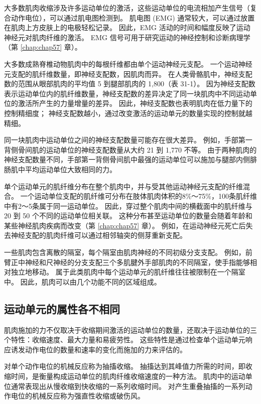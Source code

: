 大多数肌肉收缩涉及许多运动单位的激活，这些运动单位的电流相加产生信号（复合动作电位），可以通过肌电图检测到。 肌电图 (EMG) 通常较大，可以通过放置在肌肉上方皮肤上的电极轻松记录。 因此，EMG 活动的时间和幅度反映了运动神经元对肌肉纤维的激活。 EMG 信号可用于研究运动的神经控制和诊断病理学（第 \ref{chap:chap57} 章）。

大多数成熟脊椎动物肌肉中的每根纤维都由单个运动神经元支配。 一个运动神经元支配的肌纤维数量，即神经支配数，因肌肉而异。 在人类骨骼肌中，神经支配数的范围从眼部肌肉的平均值 5 到腿部肌肉的 1,800（表 31-1）。 因为神经支配数表示运动单位内的肌纤维数量，神经支配数的差异决定了同一块肌肉中不同运动单位的激活所产生的力量增量的差异。 因此，神经支配数也表明肌肉在低力量下的控制精细度； 神经支配数越小，通过改变激活的运动单元的数量实现的控制就越精细。

同一块肌肉中运动单位之间的神经支配数量可能存在很大差异。 例如，手部第一背侧骨间肌的运动单位的神经支配数量从大约 21 到 1,770 不等。 由于两种肌肉的神经支配数量不同，手部第一背侧骨间肌中最强的运动单位可以施加与腿部内侧腓肠肌中平均运动单位大致相同的力。

单个运动单元的肌纤维分布在整个肌肉中，并与受其他运动神经元支配的纤维混合。 一个运动单位支配的肌纤维可分布在肢体肌肉体积的8\%～75\%，100条肌纤维中有2～5条属于同一运动单位。 因此，穿过整个肌肉中间的横截面中的肌纤维与 20 到 50 个不同的运动单位相关联。 这种分布甚至运动单位的数量会随着年龄和某些神经肌肉疾病而改变（第 \ref{chap:chap57} 章）。 例如，在运动神经元死亡后失去神经支配的肌肉纤维可以通过相邻轴突的侧芽重新支配。

一些肌肉包含离散的隔室，每个隔室由肌肉神经的不同初级分支支配。 例如，前臂正中神经和尺神经的分支支配三个多肌腱外手部肌肉的不同隔室，使手指能够相对独立地移动。 属于此类肌肉中每个运动单元的肌纤维往往被限制在一个隔室中。 因此，肌肉可以由几个功能不同的区域组成。

\subsection{运动单元的属性各不相同}
肌肉施加的力不仅取决于收缩期间激活的运动单位的数量，还取决于运动单位的三个特性：收缩速度、最大力量和易疲劳性。 这些特性是通过检查单个运动单元响应诱发动作电位的数量和速率的变化而施加的力来评估的。

对单个动作电位的机械反应称为抽搐收缩。 抽搐达到其峰值力所需的时间，即收缩时间，是衡量构成运动单位的肌肉纤维收缩速度的一种方法。 肌肉中的运动单位通常表现出从慢收缩到快收缩的一系列收缩时间。 对产生重叠抽搐的一系列动作电位的机械反应称为强直性收缩或破伤风。


